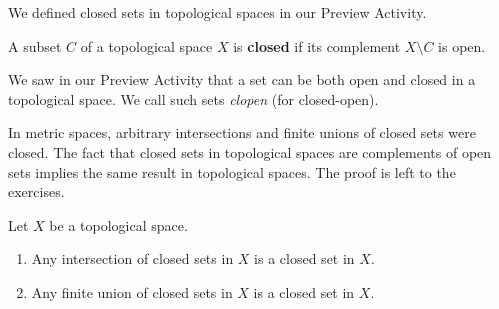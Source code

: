 We defined closed sets in topological spaces in our Preview Activity. 



\begin{definition} A subset $C$ of a topological space $X$ is \textbf{closed} if its complement $X \setminus C$ is open. 
\end{definition}



We saw in our Preview Activity that a set can be both open and closed in a topological space. We call such sets \emph{clopen} (for closed-open). 



In metric spaces, arbitrary intersections and finite unions of closed sets were closed. The fact that closed sets in topological spaces are complements of open sets implies the same result in topological spaces. The proof is left to the exercises.  



\begin{theorem} Let $X$ be a topological space.
\begin{enumerate}
\item Any intersection of closed sets in $X$ is a closed set in $X$.
\item Any finite union of closed sets in $X$ is a closed set in $X$. 
\end{enumerate}
\end{theorem}

%




%


%



